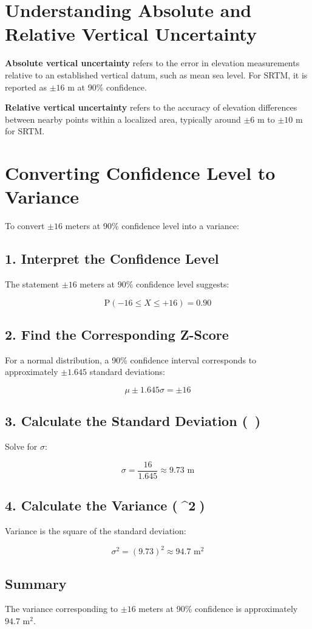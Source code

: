 \documentclass{article}
\begin{document}
\section{Understanding Absolute and Relative Vertical Uncertainty}
\textbf{Absolute vertical uncertainty} refers to the error in elevation measurements relative to an established vertical datum, such as mean sea level. For SRTM, it is reported as $\pm 16$ m at 90\% confidence.

\textbf{Relative vertical uncertainty} refers to the accuracy of elevation differences between nearby points within a localized area, typically around $\pm 6$ m to $\pm 10$ m for SRTM.

\section{Converting Confidence Level to Variance}
To convert $\pm 16$ meters at 90\% confidence level into a variance:

\subsection{1. Interpret the Confidence Level}
The statement $\pm 16$ meters at 90\% confidence level suggests:

\[
\text{P}(-16 \leq X \leq +16) = 0.90
\]

\subsection{2. Find the Corresponding Z-Score}
For a normal distribution, a 90\% confidence interval corresponds to approximately $\pm 1.645$ standard deviations:

\[
\mu \pm 1.645\sigma = \pm 16
\]

\subsection{3. Calculate the Standard Deviation (\sigma)}
Solve for $\sigma$:

\[
\sigma = \frac{16}{1.645} \approx 9.73 \text{ m}
\]

\subsection{4. Calculate the Variance (\sigma^2)}
Variance is the square of the standard deviation:

\[
\sigma^2 = (9.73)^2 \approx 94.7 \text{ m}^2
\]

\subsection{Summary}
The variance corresponding to $\pm 16$ meters at 90\% confidence is approximately $94.7 \text{ m}^2$.
\end{document}
